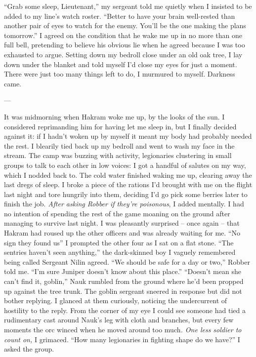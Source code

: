 \documentclass[12pt, openany]{book}
\begin{document}
“Grab some sleep, Lieutenant,” my sergeant told me quietly when I insisted to be added to my line’s watch roster. “Better to have your brain well-rested than another pair of eyes to watch for the enemy. You’ll be the one making the plans tomorrow.”
I agreed on the condition that he wake me up in no more than one full bell, pretending to believe his obvious lie when he agreed because I was too exhausted to argue. Setting down my bedroll close under an old oak tree, I lay down under the blanket and told myself I’d close my eyes for just a moment. There were just too many things left to do, I murmured to myself.
Darkness came.

—

It was midmorning when Hakram woke me up, by the looks of the sun. I considered reprimanding him for having let me sleep in, but I finally decided against it: if I hadn’t woken up by myself it meant my body had probably needed the rest. I blearily tied back up my bedroll and went to wash my face in the stream. The camp was buzzing with activity, legionaries clustering in small groups to talk to each other in low voices: I got a handful of salutes on my way, which I nodded back to. The cold water finished waking me up, clearing away the last dregs of sleep. I broke a piece of the rations I’d brought with me on the flight last night and tore hungrily into them, deciding I’d go pick some berries later to finish the job. \textit{After asking Robber if they’re poisonous}, I added mentally. I had no intention of spending the rest of the game moaning on the ground after managing to survive last night. I was pleasantly surprised – once again – that Hakram had roused up the other officers and was already waiting for me.
“No sign they found us” I prompted the other four as I sat on a flat stone.
“The sentries haven’t seen anything,” the dark-skinned boy I vaguely remembered being called Sergeant Nilin agreed.
“We should be safe for a day or two,” Robber told me. “I’m sure Juniper doesn’t know about this place.”
“Doesn’t mean she can’t find it, goblin,” Nauk rumbled from the ground where he’d been propped up against the tree trunk.
The goblin sergeant sneered in response but did not bother replying. I glanced at them curiously, noticing the undercurrent of hostility to the reply. From the corner of my eye I could see someone had tied a rudimentary cast around Nauk’s leg with cloth and branches, but every few moments the orc winced when he moved around too much\textit{. One less soldier to count on,} I grimaced.
“How many legionaries in fighting shape do we have?” I asked the group.
\end{document}
